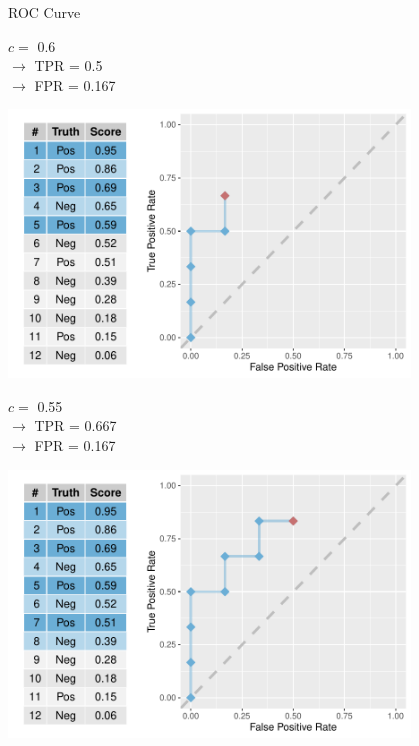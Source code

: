 \documentclass[11pt,compress,t,notes=noshow, xcolor=table]{beamer}
\newenvironment{knitrout}{}{} %
\begin{document}
\begin{vbframe}{ROC Curve}
\begin{knitrout}
{}



\end{knitrout}

$c =$ 0.6\\
$\rightarrow$ TPR = 0.5 \\
$\rightarrow$ FPR = 0.167


\framebreak

\begin{knitrout}\scriptsize
{}\color{fgcolor}

{\centering \includegraphics[width=0.8\textwidth]{figure/eval_mclass_roc_sp_9}

}



\end{knitrout}

$c =$ 0.55\\
$\rightarrow$ TPR = 0.667 \\
$\rightarrow$ FPR = 0.167

\framebreak

\begin{knitrout}\scriptsize
{}\color{fgcolor}

{\centering \includegraphics[width=0.8\textwidth]{figure/eval_mclass_roc_sp_10}

}
\end{knitrout}
\end{vbframe}
\end{document}
